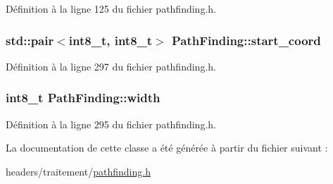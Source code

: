 Définition à la ligne 125 du fichier pathfinding.\-h.

\hypertarget{class_path_finding_a33dac4c9b17f5e6032bc0fc60e7a8249}{
\subsubsection[{start\-\_\-coord}]{\setlength{\rightskip}{0pt plus 5cm}std\-::pair$<$int8\-\_\-t, int8\-\_\-t$>$ Path\-Finding\-::start\-\_\-coord\hspace{0.3cm}{\ttfamily [private]}}}\label{class_path_finding_a33dac4c9b17f5e6032bc0fc60e7a8249}


Définition à la ligne 297 du fichier pathfinding.\-h.

\hypertarget{class_path_finding_a50f9513402ad1113678635c3eb9da62d}{
\subsubsection[{width}]{\setlength{\rightskip}{0pt plus 5cm}int8\-\_\-t Path\-Finding\-::width\hspace{0.3cm}{\ttfamily [private]}}}\label{class_path_finding_a50f9513402ad1113678635c3eb9da62d}


Définition à la ligne 295 du fichier pathfinding.\-h.



La documentation de cette classe a été générée à partir du fichier suivant \-:\begin{DoxyCompactItemize}
\item 
headers/traitement/\hyperlink{pathfinding_8h}{pathfinding.\-h}\end{DoxyCompactItemize}
